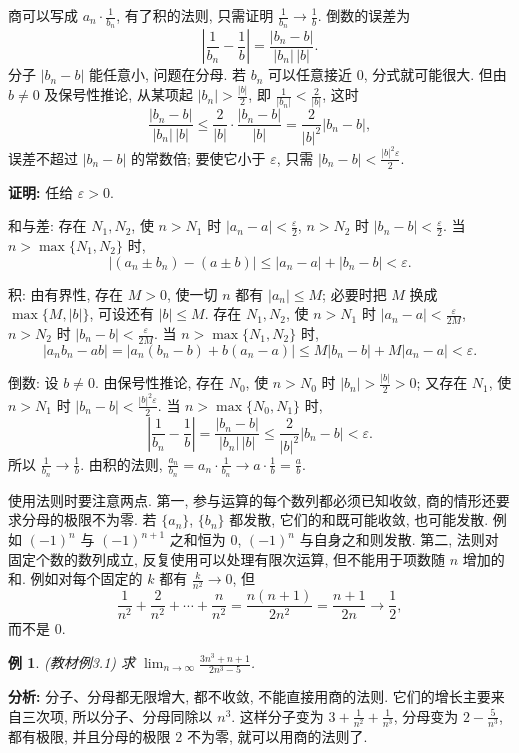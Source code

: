 \documentclass[UTF8,openany]{ctexbook}
\theoremstyle{chinesetextbook}
\newtheorem{example}{例}[section]
\newenvironment{cnproof}{\par\indent\textbf{证明:} \ignorespaces}{\par}
\begin{document}
商可以写成 $\displaystyle a_n\cdot\frac1{b_n}$, 有了积的法则, 只需证明 $\displaystyle\frac1{b_n}\to\frac1b$. 倒数的误差为
\[
\left|\frac1{b_n}-\frac1b\right|=\frac{|b_n-b|}{|b_n|\,|b|}.
\]
分子 $|b_n-b|$ 能任意小, 问题在分母. 若 $b_n$ 可以任意接近 $0$, 分式就可能很大. 但由 $b\ne0$ 及保号性推论, 从某项起 $\displaystyle|b_n|>\frac{|b|}2$, 即 $\displaystyle\frac1{|b_n|}<\frac2{|b|}$, 这时
\[
\frac{|b_n-b|}{|b_n|\,|b|}\le\frac2{|b|}\cdot\frac{|b_n-b|}{|b|}=\frac2{|b|^2}|b_n-b|,
\]
误差不超过 $|b_n-b|$ 的常数倍; 要使它小于 $\varepsilon$, 只需 $\displaystyle|b_n-b|<\frac{|b|^2\varepsilon}2$.
\begin{cnproof}
任给 $\varepsilon>0$.

和与差: 存在 $N_1,N_2$, 使 $n>N_1$ 时 $\displaystyle|a_n-a|<\frac\varepsilon2$, $n>N_2$ 时 $\displaystyle|b_n-b|<\frac\varepsilon2$. 当 $n>\max\{N_1,N_2\}$ 时,
\[
|(a_n\pm b_n)-(a\pm b)|\le|a_n-a|+|b_n-b|<\varepsilon.
\]

积: 由有界性, 存在 $M>0$, 使一切 $n$ 都有 $|a_n|\le M$; 必要时把 $M$ 换成 $\max\{M,|b|\}$, 可设还有 $|b|\le M$. 存在 $N_1,N_2$, 使 $n>N_1$ 时 $\displaystyle|a_n-a|<\frac\varepsilon{2M}$, $n>N_2$ 时 $\displaystyle|b_n-b|<\frac\varepsilon{2M}$. 当 $n>\max\{N_1,N_2\}$ 时,
\[
|a_nb_n-ab|=|a_n(b_n-b)+b(a_n-a)|\le M|b_n-b|+M|a_n-a|<\varepsilon.
\]

倒数: 设 $b\ne0$. 由保号性推论, 存在 $N_0$, 使 $n>N_0$ 时 $\displaystyle|b_n|>\frac{|b|}2>0$; 又存在 $N_1$, 使 $n>N_1$ 时 $\displaystyle|b_n-b|<\frac{|b|^2\varepsilon}2$. 当 $n>\max\{N_0,N_1\}$ 时,
\[
\left|\frac1{b_n}-\frac1b\right|=\frac{|b_n-b|}{|b_n|\,|b|}\le\frac2{|b|^2}|b_n-b|<\varepsilon.
\]
所以 $\displaystyle\frac1{b_n}\to\frac1b$. 由积的法则, $\displaystyle\frac{a_n}{b_n}=a_n\cdot\frac1{b_n}\to a\cdot\frac1b=\frac ab$.
\end{cnproof}
使用法则时要注意两点. 第一, 参与运算的每个数列都必须已知收敛, 商的情形还要求分母的极限不为零. 若 $\{a_n\}$, $\{b_n\}$ 都发散, 它们的和既可能收敛, 也可能发散. 例如 $(-1)^n$ 与 $(-1)^{n+1}$ 之和恒为 $0$, $(-1)^n$ 与自身之和则发散. 第二, 法则对固定个数的数列成立, 反复使用可以处理有限次运算, 但不能用于项数随 $n$ 增加的和. 例如对每个固定的 $k$ 都有 $\displaystyle\frac k{n^2}\to0$, 但
\[
\frac1{n^2}+\frac2{n^2}+\cdots+\frac n{n^2}=\frac{n(n+1)}{2n^2}=\frac{n+1}{2n}\to\frac12,
\]
而不是 $0$.
\begin{example}
\textnormal{(教材例3.1)} 求 $\displaystyle\lim_{n\to\infty}\frac{3n^3+n+1}{2n^3-5}$.
\end{example}
\par\indent\textbf{分析:} 分子、分母都无限增大, 都不收敛, 不能直接用商的法则. 它们的增长主要来自三次项, 所以分子、分母同除以 $n^3$. 这样分子变为 $\displaystyle3+\frac1{n^2}+\frac1{n^3}$, 分母变为 $\displaystyle2-\frac5{n^3}$, 都有极限, 并且分母的极限 $2$ 不为零, 就可以用商的法则了.
\end{document}
